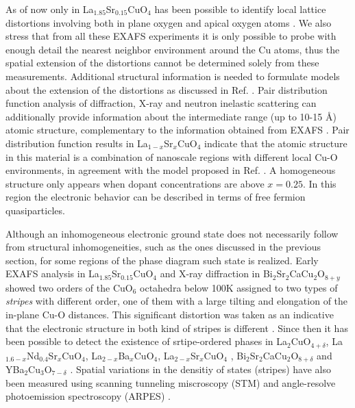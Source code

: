 As of now only in La$_{1.85}$Sr$_{0.15}$CuO$_{4}$ has been possible to identify local lattice distortions involving both in plane oxygen and apical oxygen atoms  \cite{Bianconi1996}. 
We also stress that from all these EXAFS experiments it is only possible to probe with enough detail the nearest neighbor environment around the Cu atoms, thus the spatial extension of the distortions cannot be determined solely from these measurements. 
Additional structural information \cite{Bianconi1996a} is needed to formulate models about the extension of the distortions as discussed in Ref. \cite{Bianconi1996}.
Pair distribution function analysis of diffraction, X-ray and neutron inelastic scattering can additionally provide information about the intermediate range (up to 10-15 \AA) atomic structure, complementary to the information obtained from EXAFS \cite{Egami2003}. 
Pair distribution function results in La$_{1-x}$Sr$_{x}$CuO$_{4}$ \cite{Bozin1999,Bozin2000} indicate that the atomic structure in this material is a combination of nanoscale regions with different local Cu-O environments, in agreement with the model proposed in Ref. \cite{Bianconi1996}. 
A homogeneous structure only appears when dopant concentrations are above $x = 0.25$. 
In this region the electronic behavior can be described in terms of free fermion quasiparticles.

Although an inhomogeneous electronic ground state does not necessarily follow from structural inhomogeneities, such as the ones discussed in the previous section, for some regions of the phase diagram such state is realized.
Early EXAFS analysis in La$_{1.85}$Sr$_{0.15}$CuO$_4$ and X-ray diffraction in Bi$_2$Sr$_2$CaCu$_2$O$_{8+y}$ showed two orders of the CuO$_6$ octahedra below 100K assigned to two types of \textit{stripes} with different order, one of them with a large tilting and elongation of the in-plane Cu-O distances.
This significant distortion was taken as an indicative that the electronic structure in both kind of stripes is different \cite{Bianconi1996,Bianconi1996a}.
Since then it has been possible to detect the existence of srtipe-ordered phases in La$_2$CuO$_{4+\delta}$, La$_{1.6-x}$Nd$_{0.4}$Sr$_x$CuO$_4$, La$_{2-x}$Ba$_x$CuO$_4$, La$_{2-x}$Sr$_x$CuO$_4$ \cite{Kivelson2003}, Bi$_2$Sr$_2$CaCu$_2$O$_{8+\delta}$ \cite{Poccia2011a} and YBa$_2$Cu$_3$O$_{7-\delta}$ \cite{Mook2002,Haase2003}.
Spatial variations in the densitiy of states (stripes) have also been measured using scanning tunneling miscroscopy (STM) \cite{Pan2001} and angle-resolve photoemission spectroscopy (ARPES) \cite{Salkola1996}. 

